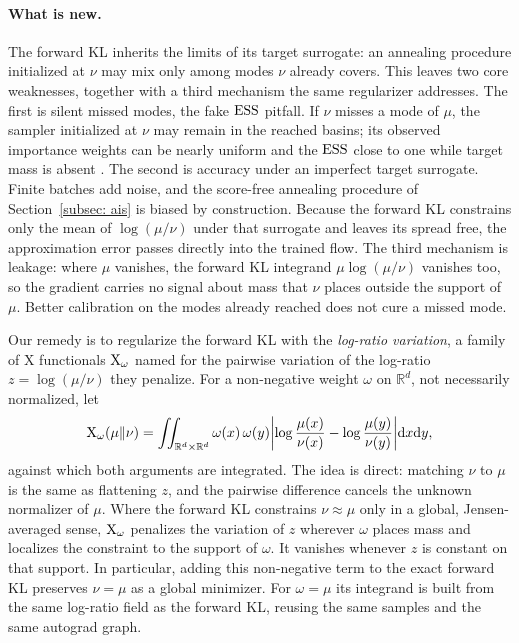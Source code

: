 \documentclass{article}
\begin{document}
\paragraph{What is new.}
The forward KL inherits the limits of its target surrogate: an annealing procedure initialized at $\nu$ may mix only among modes $\nu$ already covers. This leaves two core weaknesses, together with a third mechanism the same regularizer addresses. The first is silent missed modes, the fake $\mathrm{ESS}$ pitfall. If $\nu$ misses a mode of $\mu$, the sampler initialized at $\nu$ may remain in the reached basins; its observed importance weights can be nearly uniform and the $\mathrm{ESS}$ close to one while target mass is absent \citep{noe2019boltzmann,midgley2022flow}. The second is accuracy under an imperfect target surrogate. Finite batches add noise, and the score-free annealing procedure of Section~\ref{subsec: ais} is biased by construction. Because the forward KL constrains only the mean of $\log(\mu/\nu)$ under that surrogate and leaves its spread free, the approximation error passes directly into the trained flow. The third mechanism is leakage: where $\mu$ vanishes, the forward KL integrand $\mu\log(\mu/\nu)$ vanishes too, so the gradient carries no signal about mass that $\nu$ places outside the support of $\mu$. Better calibration on the modes already reached does not cure a missed mode.

Our remedy is to regularize the forward KL with the \emph{log-ratio variation}, a family of X functionals $\mathrm{X}_\omega$ named for the pairwise variation of the log-ratio $z=\log(\mu/\nu)$ they penalize. For a non-negative weight $\omega$ on $\mathbb R^d$, not necessarily normalized, let
\begin{equation}
    \mathrm{X}_\omega(\mu\|\nu) = \iint_{\mathbb R^d\times\mathbb R^d} \omega(x)\,\omega(y)
    \biggl|\log\frac{\mu(x)}{\nu(x)} - \log\frac{\mu(y)}{\nu(y)}\biggr| \mathrm{d} x \mathrm{d} y,
    \label{eq: X}
\end{equation}
against which both arguments are integrated. The idea is direct: matching $\nu$ to $\mu$ is the same as flattening $z$, and the pairwise difference cancels the unknown normalizer of $\mu$. Where the forward KL constrains $\nu\approx\mu$ only in a global, Jensen-averaged sense, $\mathrm{X}_\omega$ penalizes the variation of $z$ wherever $\omega$ places mass and localizes the constraint to the support of $\omega$. It vanishes whenever $z$ is constant on that support. In particular, adding this non-negative term to the exact forward KL preserves $\nu=\mu$ as a global minimizer. For $\omega=\mu$ its integrand is built from the same log-ratio field as the forward KL, reusing the same samples and the same autograd graph.
\end{document}

